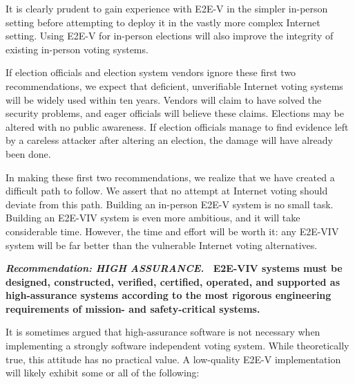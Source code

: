 It is clearly prudent to gain experience with E2E-V in the simpler
in-person setting before attempting to deploy it in the vastly more
complex Internet setting. Using E2E-V for in-person elections will
also improve the integrity of existing in-person voting systems.
 
If election officials and election system vendors ignore these first
two recommendations, we expect that deficient, unverifiable Internet
voting systems will be widely used within ten years.  Vendors will
claim to have solved the security problems, and eager officials will
believe these claims.  Elections may be altered with no public
awareness.  If election officials manage to find evidence left by a
careless attacker after altering an election, the damage will have
already been done.
 
In making these first two recommendations, we realize that we have
created a difficult path to follow. We assert that no attempt at
Internet voting should deviate from this path.  Building an in-person
E2E-V system is no small task. Building an E2E-VIV system is even more
ambitious, and it will take considerable time. However, the time and
effort will be worth it: any E2E-VIV system will be far better than
the vulnerable Internet voting alternatives. 

\vspace{12pt} 
\textbf{\emph{Recommendation: HIGH ASSURANCE.} \ E2E-VIV systems must
  be designed, constructed, verified, certified, operated, and
  supported as high-assurance systems according to the most rigorous
  engineering requirements of mission- and safety-critical systems.}

It is sometimes argued that high-assurance software is not necessary
when implementing a strongly software independent voting system. While
theoretically true, this attitude has no practical value. A
low-quality E2E-V implementation will likely exhibit some or all of
the following:

